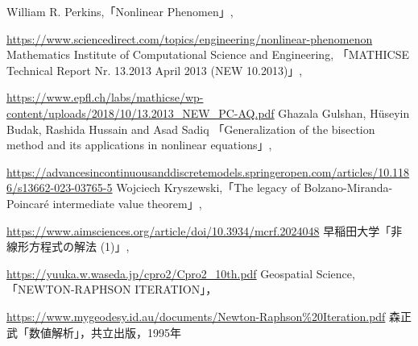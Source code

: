 \documentclass[uplatex]{jsarticle}
\begin{document}
\begin{thebibliography}{9}
William R. Perkins,「Nonlinear Phenomen」,

\url{https://www.sciencedirect.com/topics/engineering/nonlinear-phenomenon}
 Mathematics Institute of Computational Science and Engineering, 「MATHICSE Technical Report
Nr. 13.2013
April 2013 (NEW 10.2013)」,

\url{https://www.epfl.ch/labs/mathicse/wp-content/uploads/2018/10/13.2013_NEW_PC-AQ.pdf}
 Ghazala Gulshan, Hüseyin Budak, Rashida Hussain and Asad Sadiq
「Generalization of the bisection method and its applications in nonlinear equations」,

\url{https://advancesincontinuousanddiscretemodels.springeropen.com/articles/10.1186/s13662-023-03765-5}
 Wojciech Kryszewski,「The legacy of Bolzano-Miranda-Poincaré intermediate value theorem」,

\url{https://www.aimsciences.org/article/doi/10.3934/mcrf.2024048}
 早稲田大学「非線形方程式の解法 (1)」,

\url{https://yuuka.w.waseda.jp/cpro2/Cpro2_10th.pdf}
 Geospatial Science,「NEWTON-RAPHSON ITERATION」，

\url{https://www.mygeodesy.id.au/documents/Newton-Raphson%20Iteration.pdf}
 森正武「数値解析」，共立出版，1995年
\end{thebibliography}
\end{document}
